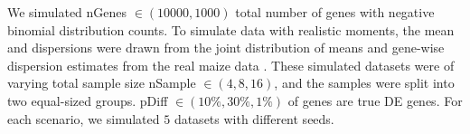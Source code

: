 We simulated nGenes $\in (10000, 1000)$ total number of genes with negative binomial distribution counts. To simulate data with realistic moments, the mean and dispersions were drawn from the joint distribution of means and gene-wise dispersion estimates from the real maize data \citep{paschold2012complementation}. These simulated datasets were of varying total sample size nSample $\in {(4,8,16)}$, and the samples were split into two equal-sized groups. pDiff $\in {(10\%, 30\%, 1\%)}$ of genes are true DE genes. For each scenario, we simulated $5$ datasets with different seeds.









